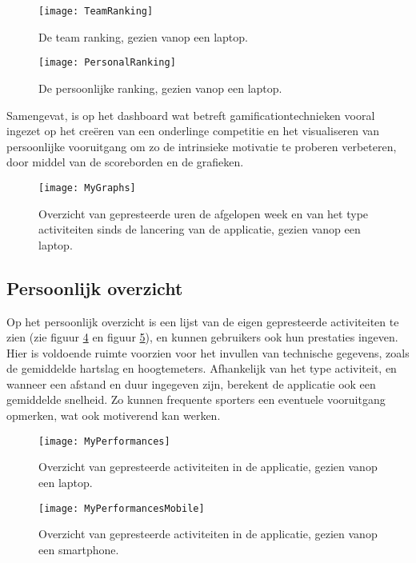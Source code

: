 \begin{figure}[h]
    \caption[Team ranking]{De team ranking, gezien vanop een laptop.}
    \texttt{[image: TeamRanking]}
    \label{fig:teamRanking}
\end{figure}

\begin{figure}[h]
    \caption[Persoonlijke ranking]{De persoonlijke ranking, gezien vanop een laptop.}
    \texttt{[image: PersonalRanking]}
    \label{fig:personalRanking}
\end{figure}

Samengevat, is op het dashboard wat betreft gamificationtechnieken vooral ingezet op het creëren van een onderlinge competitie en het visualiseren van persoonlijke vooruitgang om zo de intrinsieke motivatie te proberen verbeteren, door middel van de scoreborden en de grafieken.

\begin{figure}[h]
    \caption[Overzicht prestaties dashboard website]{Overzicht van gepresteerde uren de afgelopen week en van het type activiteiten sinds de lancering van de applicatie, gezien vanop een laptop.}
    \texttt{[image: MyGraphs]}
    \label{fig:graphs}
\end{figure}

\subsection{Persoonlijk overzicht}
Op het persoonlijk overzicht is een lijst van de eigen gepresteerde activiteiten te zien (zie figuur \ref{fig:performances} en figuur \ref{fig:performancesMobile}), en kunnen gebruikers ook hun prestaties ingeven. Hier is voldoende ruimte voorzien voor het invullen van technische gegevens, zoals de gemiddelde hartslag en hoogtemeters. Afhankelijk van het type activiteit, en wanneer een afstand en duur ingegeven zijn, berekent de applicatie ook een gemiddelde snelheid. Zo kunnen frequente sporters een eventuele vooruitgang opmerken, wat ook motiverend kan werken.

\begin{figure}[h]
    \caption[Overzicht activiteiten website]{Overzicht van gepresteerde activiteiten in de applicatie, gezien vanop een laptop.}
    \texttt{[image: MyPerformances]}
    \label{fig:performances}
\end{figure}

\begin{figure}[h]
    \caption[Overzicht activiteiten website smartphone]{Overzicht van gepresteerde activiteiten in de applicatie, gezien vanop een smartphone.}
    \texttt{[image: MyPerformancesMobile]}
    \label{fig:performancesMobile}
\end{figure}

